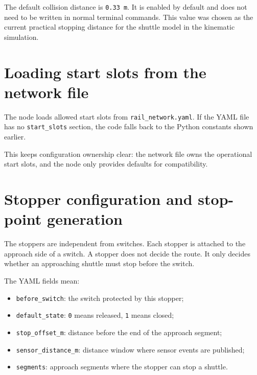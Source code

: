 \documentclass[12pt,a4paper]{report}
\newcommand{\codenext}[1]{\par\Needspace{#1\baselineskip}}
\begin{document}
The default collision distance is \texttt{0.33 m}. It is enabled by default and
does not need to be written in normal terminal commands. This value was chosen
as the current practical stopping distance for the shuttle model in the
kinematic simulation.

\section{Loading start slots from the network file}

The node loads allowed start slots from
\texttt{rail\_network.yaml}. If the YAML file has no \texttt{start\_slots}
section, the code falls back to the Python constants shown earlier.

\codenext{20}


This keeps configuration ownership clear: the network file owns the operational
start slots, and the node only provides defaults for compatibility.

\section{Stopper configuration and stop-point generation}

The stoppers are independent from switches. Each stopper is attached to the
approach side of a switch. A stopper does not decide the route. It only decides
whether an approaching shuttle must stop before the switch.

\codenext{36}


The YAML fields mean:

\begin{itemize}
\item \texttt{before\_switch}: the switch protected by this stopper;
\item \texttt{default\_state}: \texttt{0} means released, \texttt{1} means closed;
\item \texttt{stop\_offset\_m}: distance before the end of the approach segment;
\item \texttt{sensor\_distance\_m}: distance window where sensor events are
published;
\item \texttt{segments}: approach segments where the stopper can stop a shuttle.
\end{itemize}
\end{document}
